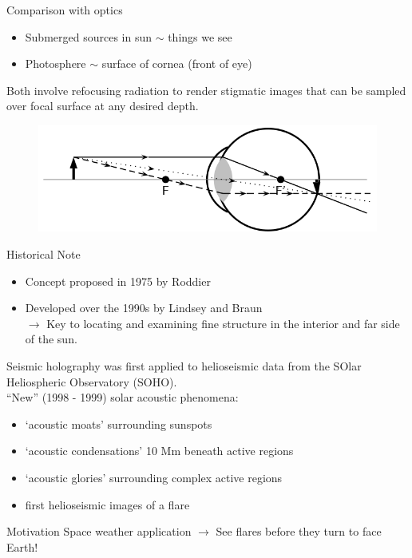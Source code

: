 \documentclass{beamer}
\begin{document}
\begin{frame}{Comparison with optics}
    \begin{itemize}
        \item Submerged sources in sun $\sim$ things we see
        \item Photosphere $\sim$ surface of cornea (front of eye)
    \end{itemize}
    Both involve refocusing radiation to render stigmatic images
    that can be sampled over focal surface at any desired depth.
    \begin{figure}
        \includegraphics[width=\textwidth]{eye.png}
    \end{figure}
\end{frame}

\begin{frame}{Historical Note}
    \begin{itemize}
        \item Concept proposed in 1975 by Roddier
        \item Developed over the 1990s by Lindsey and Braun\\
            $\rightarrow$ Key to locating and examining
            fine structure in the interior and far side of the sun.
    \end{itemize}
    Seismic holography was first applied to helioseismic data from
    the SOlar Heliospheric Observatory (SOHO).\\
    ``New'' (1998 - 1999) solar acoustic phenomena:
    \begin{itemize}
        \item `acoustic moats' surrounding sunspots
        \item `acoustic condensations' 10 Mm beneath active regions
        \item `acoustic glories' surrounding complex active regions
        \item first helioseismic images of a flare
    \end{itemize}
\end{frame}
\begin{frame}{Motivation}
    Space weather application $\rightarrow$
    See flares before they turn to face Earth!
\end{frame}
\end{document}
